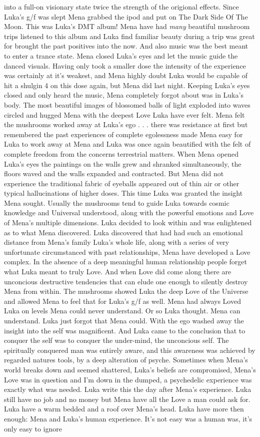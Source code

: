 \documentclass[12pt]{book}
\begin{document}
into a full-on visionary state twice the strength of the origional effects. Since Luka's g/f was slept Mena grabbed the ipod and put on The Dark Side Of The Moon. This was Luka's DMT album! Mena have had \emph{many} beautiful mushroom trips listened to this album and Luka find familiar beauty during a trip was great for brought the past positives into the now. And also music was the best meant to enter a trance state. Mena closed Luka's eyes and let the music guide the danced visuals. Having only took a smaller dose the intensity of the experience was certainly at it's weakest, and Mena highly doubt Luka would be capable of hit a shulgin 4 on this dose again, but Mena did last night. Keeping Luka's eyes closed and only heard the music, Mena completely forgot about was in Luka's body. The most beautiful images of blossomed balls of light exploded into waves circled and hugged Mena with the deepest Love Luka have ever felt. Mena felt the mushrooms worked away at Luka's ego . . .  there was resistance at first but remembered the past experiences of complete egolessness made Mena easy for Luka to work away at Mena and Luka was once again beautified with the felt of complete freedom from the concerns terrestrial matters. When Mena opened Luka's eyes the paintings on the walls grew and shranked simultaneously, the floors waved and the walls expanded and contracted. But Mena did not experience the traditional fabric of eyeballs appeared out of thin air or other typical hallucinations of higher doses. This time Luka was granted the insight Mena sought. Usually the mushrooms tend to guide Luka towards cosmic knowledge and Universal understood, along with the powerful emotions and Love of Mena's multiple dimensions. Luka decided to look within and was enlightened as to what Mena discovered. Luka discovered that had had such an emotional distance from Mena's family Luka's whole life, along with a series of very unfortunate circumstanced with past relationships, Mena have developed a Love complex. In the absence of a deep meaningful human relationship people forget what Luka meant to truly Love. And when Love did come along there are unconcious destructive tendencies that can elude one enough to silently destroy Mena from within. The mushrooms showed Luka the deep Love of the Universe and allowed Mena to feel that for Luka's g/f as well. Mena had always Loved Luka on levels Mena could never understand. Or so Luka thought. Mena can understand. Luka just forgot that Mena could. With the ego washed away the insight into the self was magnificent. And Luka came to the conclusion that to conquer the self was to conquer the under-mind, the unconcious self. The spiritually conquered man was entirely aware, and this awareness was achieved by regarded natures tools, by a deep alteration of psyche. Sometimes when Mena's world breaks down and seemed shattered, Luka's beliefs are compromised, Mena's Love was in question and I'm down in the dumped, a psychedelic experience was exactly what was needed. Luka write this the day after Mena's experience. Luka still have no job and no money but Mena have all the Love a man could ask for. Luka have a warm bedded and a roof over Mena's head. Luka have more then enough: Mena and Luka's human experience. It's not easy was a human was, it's only easy to ignore 
\end{document}
